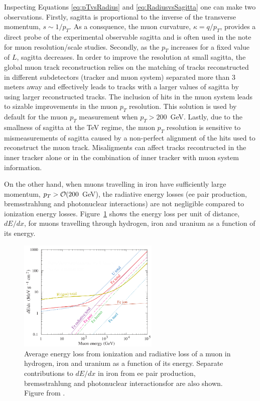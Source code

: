 Inspecting Equations \eqref{eq:pTvsRadius} and \eqref{eq:RadiusvsSagitta} one can make two observations. Firstly, sagitta is proportional to the inverse of the transverse momentum, $s\sim1/p_{T}$. As a consquence, the muon curvature, $\kappa=q/p_{T}$, provides a direct probe of the experimental observable sagitta and is often used in the note for muon resolution/scale studies. Secondly, as the $p_{T}$ increases for a fixed value of $L$, sagitta decreases. In order to improve the resolution at small sagitta, the global muon track reconstruction relies on the matching of tracks reconstructed in different subdetectors (tracker and muon system) separated more than 3 meters away and effectively leads to tracks with a larger values of sagitta by using larger reconstructed tracks. The inclusion of hits in the muon system leads to sizable improvements in the muon $p_{T}$ resolution. This solution is used by default for the muon $p_{T}$ measurement when $p_{T}>200$~GeV. Lastly, due to the smallness of sagitta at the TeV regime, the muon $p_{T}$ resolution is sensitive to mismeasurements of sagitta caused by a non-perfect alignment of the hits used to reconstruct the muon track. Misaligments can affect tracks recontructed in the inner tracker alone or in the combination of inner tracker with muon system information.

On the other hand, when muons travelling in iron have sufficiently large momentum,  $p_{T} > {\cal O}(200~$GeV), the radiative energy losses (ee pair production, bremsstrahlung and photonuclear interactions) are not negligible compared to ionization energy losses.  Figure~\ref{fig:dEdX} shows the energy loss per unit of distance, $dE/dx$, for muons travelling through hydrogen, iron and uranium as a function of its energy.

\begin{figure}
\centering
\includegraphics[width=0.60\textwidth]{figures/dEdx.png}
\caption{Average energy loss from ionization and radiative loss of a muon in hydrogen, iron and uranium as a function of its energy. Separate contributions to $dE/dx$ in iron from ee pair production, bremsstrahlung and photonuclear interactionsfor are also shown. Figure from \cite{Tanabashi:2018oca}.}
\label{fig:dEdX}        
\end{figure}


